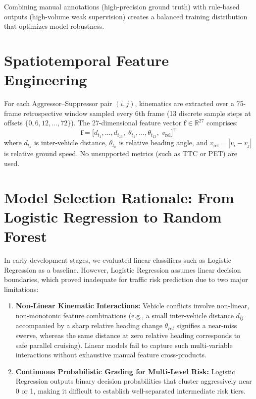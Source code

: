 \documentclass[12pt,a4paper]{report}
\begin{document}
Combining manual annotations (high-precision ground truth) with rule-based outputs (high-volume weak supervision) creates a balanced training distribution that optimizes model robustness.

\section{Spatiotemporal Feature Engineering}

For each Aggressor--Suppressor pair $(i, j)$, kinematics are extracted over a 75-frame retrospective window sampled every 6th frame (13 discrete sample steps at offsets $\{0, 6, 12, \ldots, 72\}$). The 27-dimensional feature vector $\mathbf{f} \in \mathbb{R}^{27}$ comprises:
\begin{equation}
    \mathbf{f} = \bigl[d_{t_1}, \ldots, d_{t_{13}},\;\theta_{t_1}, \ldots, \theta_{t_{13}},\;v_{\text{rel}}\bigr]^\top
\end{equation}
where $d_{t_k}$ is inter-vehicle distance, $\theta_{t_k}$ is relative heading angle, and $v_{\text{rel}} = |v_i - v_j|$ is relative ground speed. No unsupported metrics (such as TTC or PET) are used.

\section{Model Selection Rationale: From Logistic Regression to Random Forest}

In early development stages, we evaluated linear classifiers such as Logistic Regression as a baseline. However, Logistic Regression assumes linear decision boundaries, which proved inadequate for traffic risk prediction due to two major limitations:
\begin{enumerate}
    \item \textbf{Non-Linear Kinematic Interactions:} Vehicle conflicts involve non-linear, non-monotonic feature combinations (e.g., a small inter-vehicle distance $d_{ij}$ accompanied by a sharp relative heading change $\theta_{rel}$ signifies a near-miss swerve, whereas the same distance at zero relative heading corresponds to safe parallel cruising). Linear models fail to capture such multi-variable interactions without exhaustive manual feature cross-products.
    \item \textbf{Continuous Probabilistic Grading for Multi-Level Risk:} Logistic Regression outputs binary decision probabilities that cluster aggressively near 0 or 1, making it difficult to establish well-separated intermediate risk tiers.
\end{enumerate}
\end{document}
